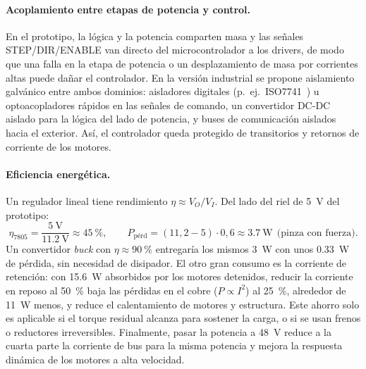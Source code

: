 \paragraph{Acoplamiento entre etapas de potencia y control.}
En el prototipo, la lógica y la potencia comparten masa y las señales STEP/DIR/ENABLE van
directo del microcontrolador a los drivers, de modo que una falla en la etapa de potencia o un
desplazamiento de masa por corrientes altas puede dañar el controlador. En la versión
industrial se propone aislamiento galvánico entre ambos dominios: aisladores digitales
(p.~ej.\ ISO7741~\cite{iso7741}) u optoacopladores rápidos en las señales de comando, un
convertidor DC-DC aislado para la lógica del lado de potencia, y buses de comunicación
aislados hacia el exterior. Así, el controlador queda protegido de transitorios y retornos de
corriente de los motores.

\paragraph{Eficiencia energética.}
Un regulador lineal tiene rendimiento $\eta \approx V_O/V_I$. Del lado del riel de
\SI{5}{\volt} del prototipo:
\begin{equation}
  \eta_{7805} = \frac{\SI{5}{\volt}}{\SI{11,2}{\volt}} \approx \SI{45}{\percent},
  \qquad
  P_{\mathrm{pérd}} = (11{,}2-5)\cdot 0{,}6 \approx \SI{3,7}{\watt}\ \ \text{(pinza con fuerza)}.
\end{equation}
Un convertidor \emph{buck} con $\eta\approx\SI{90}{\percent}$ entregaría los mismos
\SI{3}{\watt} con unos \SI{0,33}{\watt} de pérdida, sin necesidad de disipador. El otro gran
consumo es la corriente de retención: con \SI{15,6}{\watt} absorbidos por los motores
detenidos, reducir la corriente en reposo al 50~\% baja las pérdidas en el cobre
($P\propto I^2$) al 25~\%, alrededor de \SI{11}{\watt} menos, y reduce el calentamiento de
motores y estructura. Este ahorro solo es aplicable si el torque residual alcanza para sostener
la carga, o si se usan frenos o reductores irreversibles. Finalmente, pasar la potencia a
\SI{48}{\volt} reduce a la cuarta parte la corriente de bus para la misma potencia y mejora la
respuesta dinámica de los motores a alta velocidad.
